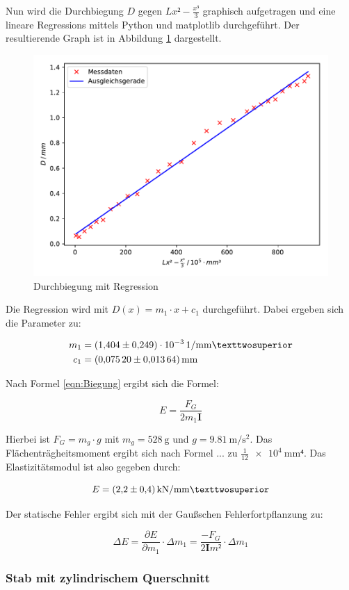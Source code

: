 Nun wird die Durchbiegung $D$ gegen $Lx²-\frac{x³}{3}$ graphisch aufgetragen
und eine lineare Regressions mittels Python und matplotlib durchgeführt.
Der resultierende Graph ist in Abbildung \ref{fig:plot1} dargestellt.

\begin{figure}
  \centering
  \includegraphics[scale=0.8]{content/plot1.pdf}
  \caption{Durchbiegung mit Regression}
  \label{fig:plot1}
\end{figure}

Die Regression wird mit $D(x) = m_1\cdot x + c_1$ durchgeführt. Dabei ergeben 
sich die Parameter zu: 

\begin{align*}
m_1 &= \SI{1.404+-0.249e-3}{1\per\milli\meter²}\\
c_1 &= \SI{0.0752+-0.01364}{\milli\meter}
\end{align*}

Nach Formel \eqref{eqn:Biegung} ergibt sich die Formel: 

\begin{equation*}
E = \frac{F_G}{2m_1\symbf{I}}
\end{equation*}

Hierbei ist $F_G = m_g\cdot g$ mit $m_g = \SI{528}{\gram}$ und 
$g = \SI{9.81}{\meter\per\second\squared}$. Das Flächenträgheitsmoment
ergibt sich nach Formel ... zu $\frac{1}{12} \SI{e4}{\milli\meter⁴}$. 
Das Elastizitätsmodul ist also gegeben durch: 

\begin{equation*}
E = \SI{2.2+-0.4}{\kilo\newton\per\milli\meter²}
\end{equation*}

Der statische Fehler ergibt sich mit der Gaußschen Fehlerfortpflanzung zu: 

\begin{equation*}
\Delta E = \frac{\partial E}{\partial m_1}\cdot \Delta m_1 
= \frac{-F_G}{2\symbf{I}m²} \cdot \Delta m_1
\end{equation*}


\subsubsection{Stab mit zylindrischem Querschnitt}